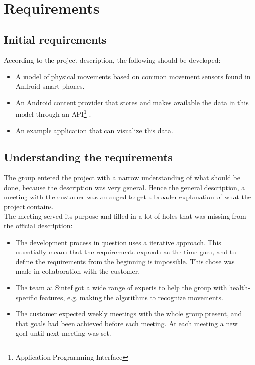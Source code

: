 \chapter{Requirements}
\section{Initial requirements}

According to the project description, the following should be developed:
\begin{itemize}
\item A model of physical movements based on common movement sensors found in Android smart phones.
\item An Android content provider that stores and makes available the data in this model through an API\footnote{Application Programming Interface} .
\item An example application that can visualize this data.
\end{itemize}

\section{Understanding the requirements}

The group entered the project with a narrow understanding of what should be done, because the description was very general. Hence the general description, a meeting with the customer was arranged to get a broader explanation of what the project contains.\\
The meeting served its purpose and filled in a lot of holes that was missing from the official description:
\begin{itemize}
\item The development process in question uses a iterative approach. This essentially means that the requirements expands as the time goes, and to define the requirements from the beginning is impossible. This chose was made in collaboration with the customer.
\item The team at Sintef got a wide range of experts to help the group with health-specific features, e.g. making the algorithms to recognize movements.
\item The customer expected weekly meetings with the whole group present, and that goals had been achieved before each meeting. At each meeting a new goal until next meeting was set.
\end{itemize}